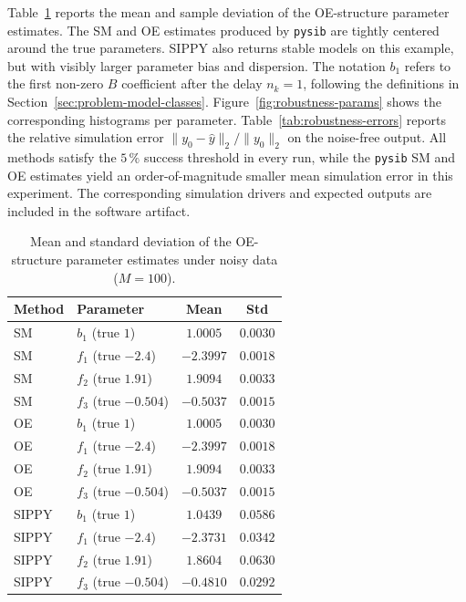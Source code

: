 \documentclass{ifacconf}
\begin{document}
Table~\ref{tab:robustness-params} reports the mean and sample deviation of
the OE-structure parameter estimates.  The SM and OE estimates produced by
\texttt{pysib} are tightly centered around the true parameters.  SIPPY also
returns stable models on this example, but with visibly larger parameter
bias and dispersion.  The notation $b_1$ refers to the first non-zero
$B$ coefficient after the delay $n_k=1$, following the definitions in
Section~\ref{sec:problem-model-classes}.
Figure~\ref{fig:robustness-params} shows the corresponding histograms per
parameter.  Table~\ref{tab:robustness-errors} reports the relative
simulation error $\|y_0-\hat y\|_2/\|y_0\|_2$ on the noise-free output.
All methods satisfy the $5\,\%$ success threshold in every run, while the
\texttt{pysib} SM and OE estimates yield an order-of-magnitude smaller mean
simulation error in this experiment.  The corresponding simulation drivers
and expected outputs are included in the software artifact.

\begin{table}[t]
  \caption{Mean and standard deviation of the OE-structure parameter
           estimates under noisy data ($M=100$).}
  \label{tab:robustness-params}
  \centering
  \footnotesize
  \begin{tabular}{llcc}
    \toprule
    Method & Parameter & Mean & Std \\
    \midrule
    SM & $b_1$ (true $1$) & $1.0005$ & $0.0030$ \\
    SM & $f_1$ (true $-2.4$) & $-2.3997$ & $0.0018$ \\
    SM & $f_2$ (true $1.91$) & $1.9094$ & $0.0033$ \\
    SM & $f_3$ (true $-0.504$) & $-0.5037$ & $0.0015$ \\
    OE & $b_1$ (true $1$) & $1.0005$ & $0.0030$ \\
    OE & $f_1$ (true $-2.4$) & $-2.3997$ & $0.0018$ \\
    OE & $f_2$ (true $1.91$) & $1.9094$ & $0.0033$ \\
    OE & $f_3$ (true $-0.504$) & $-0.5037$ & $0.0015$ \\
    SIPPY & $b_1$ (true $1$) & $1.0439$ & $0.0586$ \\
    SIPPY & $f_1$ (true $-2.4$) & $-2.3731$ & $0.0342$ \\
    SIPPY & $f_2$ (true $1.91$) & $1.8604$ & $0.0630$ \\
    SIPPY & $f_3$ (true $-0.504$) & $-0.4810$ & $0.0292$ \\
    \bottomrule
  \end{tabular}
\end{table}
\end{document}
